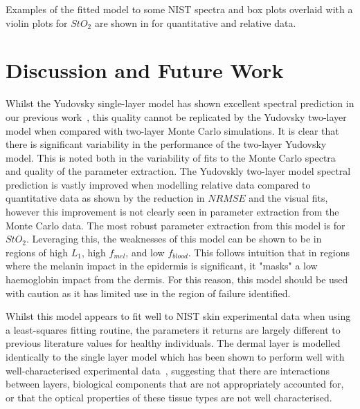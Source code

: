 Examples of the fitted model to some NIST spectra and box plots overlaid with a violin plots for $StO_2$ are shown in  for quantitative and relative data. 
\FloatBarrier

\section{Discussion and Future Work}\label{sec:discussion2}
Whilst the Yudovsky single-layer model has shown excellent spectral prediction in our previous work~\citep{Bahl2023a}, this quality cannot be replicated by the Yudovsky two-layer model when compared with two-layer Monte Carlo simulations. It is clear that there is significant variability in the performance of the two-layer Yudovsky model. This is noted both in the variability of fits to the Monte Carlo spectra and quality of the parameter extraction. The Yudovskly two-layer model spectral prediction is vastly improved when modelling relative data compared to quantitative data as shown by the reduction in $NRMSE$ and the visual fits, however this improvement is not clearly seen in parameter extraction from the Monte Carlo data. The most robust parameter extraction from this model is for $StO_2$. Leveraging this, the weaknesses of this model can be shown to be in regions of high $L_1$, high $f_{mel}$, and low $f_{blood}$. This follows intuition that in regions where the melanin impact in the epidermis is significant, it "masks" a low haemoglobin impact from the dermis. For this reason, this model should be used with caution as it has limited use in the region of failure identified.

Whilst this model appears to fit well to NIST skin experimental data when using a least-squares fitting routine, the parameters it returns are largely different to previous literature values for healthy individuals. The dermal layer is modelled identically to the single layer model which has been shown to perform well with well-characterised experimental data~\citep{Bahl2023a}, suggesting that there are interactions between layers, biological components that are not appropriately accounted for, or that the optical properties of these tissue types are not well characterised.  

